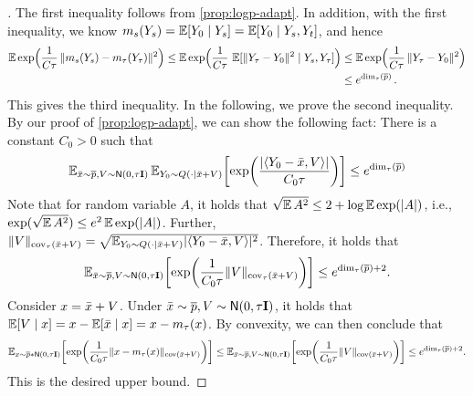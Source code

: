 \begin{proof}[]
The first inequality follows from \cref{prop:logp-adapt}. In addition, with the first inequality, we know $m_s(Y_s)=\En[Y_0\mid Y_s]=\En[Y_0\mid Y_s,Y_t]$, and hence
\begin{align*}
    \En\exp\prn[\Big]{ \frac{1}{C\tau}\,\nrm{m_s(Y_s)-m_\tau(Y_\tau)}^2 }
    \leq \En\exp\prn[\Big]{ \frac{1}{C\tau}\,\En[\nrm{Y_\tau-Y_0}^2\mid Y_s,Y_\tau] }
    &\leq \En\exp\prn[\Big]{\frac{1}{C\tau} \,\nrm{Y_\tau-Y_0}^2}\\
    &\leq e^{\dim_\tau(\pbar)}\,.
\end{align*}
This gives the third inequality. In the following, we prove the second inequality. 
By our proof of \cref{prop:logp-adapt}, we can show the following fact: There is a constant $C_0>0$ such that 
\begin{align*}
    \En_{\xbar\sim \pbar, V\sim \normal{0,\tau\Id}} \En_{Y_0\sim Q(\cdot\mid \xbar+V)}\brk*{ \exp\prn*{ \frac{\abs{\tri{Y_0-\xbar, V}}}{C_0\tau} } }\leq e^{\dim_\tau(\pbar)}
\end{align*}
Note that for random variable $A$, it holds that $\sqrt{\En A^2}\leq 2+\log\En \exp(\abs{A})$, i.e., $\exp(\sqrt{\En A^2})\leq e^2\En \exp(\abs{A})$. Further, $\nrm{V}_{\cov_\tau(\xbar+V)}=\sqrt{\En_{Y_0\sim Q(\cdot\mid \xbar+V)}\abs{\tri{Y_0-\xbar, V}}^2}$. Therefore, it holds that
\begin{align*}
    \En_{\xbar\sim \pbar, V\sim \normal{0,\tau\Id}}\brk*{ \exp\prn*{ \frac{1}{C_0\tau}\nrm{V}_{\cov_\tau(\xbar+V)} } }\leq e^{\dim_\tau(\pbar)+2}.
\end{align*}
Consider $x=\xbar+V$. Under $\xbar\sim \pbar, V\sim \normal{0,\tau\Id}$, it holds that $\En[V\mid x]=x-\En[\xbar\mid x]=x-m_\tau(x)$. By convexity, we can then conclude that
\begin{align*}
    \En_{x\sim \pbar*\normal{0,\tau\Id}}\brk*{ \exp\prn*{ \frac{1}{C_0\tau}\nrm{x-m_\tau(x)}_{\cov(\xbar+V)} } }
    \leq\En_{\xbar\sim \pbar, V\sim \normal{0,\tau\Id}}\brk*{ \exp\prn*{ \frac{1}{C_0\tau}\nrm{V}_{\cov(\xbar+V)} } }\leq e^{\dim_\tau(\pbar)+2}.
\end{align*}
This is the desired upper bound.
\end{proof}





